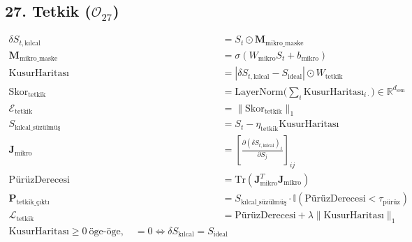 \documentclass[11pt, a4paper]{article}
\begin{document}
\subsection{27. Tetkik ($\mathcal{O}_{27}$)}
\begin{align}
\delta S_{t, \text{kılcal}} &= S_t \odot \mathbf{M}_{\text{mikro\_maske}} \\
\mathbf{M}_{\text{mikro\_maske}} &= \sigma(W_{\text{mikro}} S_t + b_{\text{mikro}}) \\
\text{KusurHaritası} &= |\delta S_{t, \text{kılcal}} - S_{\text{ideal}}| \odot W_{\text{tetkik}} \\
\text{Skor}_{\text{tetkik}} &= \text{LayerNorm}\Big( \textstyle\sum_{i} \text{KusurHaritası}_{i\cdot} \Big) \in \mathbb{R}^{d_{\text{sem}}} \\
\mathcal{E}_{\text{tetkik}} &= \| \text{Skor}_{\text{tetkik}} \|_1 \\
S_{\text{kılcal\_süzülmüş}} &= S_t - \eta_{\text{tetkik}} \text{KusurHaritası} \\
\mathbf{J}_{\text{mikro}} &= \left[ \frac{\partial (\delta S_{t, \text{kılcal}})_i}{\partial S_j} \right]_{ij} \\
\text{PürüzDerecesi} &= \text{Tr}(\mathbf{J}_{\text{mikro}}^T \mathbf{J}_{\text{mikro}}) \\
\mathbf{P}_{\text{tetkik\_çıktı}} &= S_{\text{kılcal\_süzülmüş}} \cdot \mathbb{I}(\text{PürüzDerecesi} < \tau_{\text{pürüz}}) \\
\mathcal{L}_{\text{tetkik}} &= \text{PürüzDerecesi} + \lambda \| \text{KusurHaritası} \|_1 \\
\text{KusurHaritası} \ge 0 \ \text{öge-öge}, \quad = 0 \iff \delta S_{\text{kılcal}} = S_{\text{ideal}}
\end{align}
\end{document}
